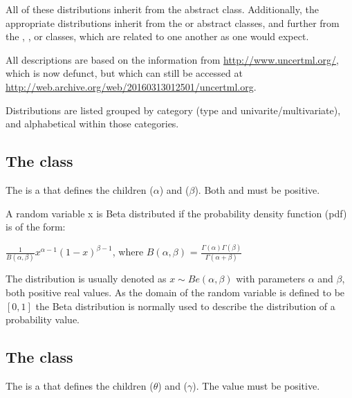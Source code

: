 All of these distributions inherit from the abstract \Distribution class.  Additionally, the appropriate distributions inherit from the \UnivariateDistribution or \MultivariateDistribution abstract classes, and further from the \ContinuousUnivariateDistribution, \DiscreteUnivariateDistribution, or \CategoricalUnivariateDistribution classes, which are related to one another as one would expect.

All descriptions are based on the information from \url{http://www.uncertml.org/}, which is now defunct, but which can still be accessed at \url{http://web.archive.org/web/20160313012501/uncertml.org}.

Distributions are listed grouped by category (type and univarite/multivariate), and alphabetical within those categories.


\subsection{The  class}
\label{BetaDistribution-class}
\label{betadistribution-class}

The \BetaDistribution is a \ContinuousUnivariateDistribution that defines the \UncertValue children  ($\alpha$) and  ($\beta$).  Both  and  must be positive.

A random variable x is Beta distributed if the probability density function (pdf) is of the form:

\begin{center}
$\frac{1}{B\left(\alpha,\beta\right)}x^{\alpha-1}\left(1-x\right)^{\beta-1}$, where $B\left(\alpha,\beta\right)$ = $\frac{\Gamma\left(\alpha\right)\Gamma\left(\beta\right)}{\Gamma\left(\alpha+\beta\right)}$
\end{center}

The distribution is usually denoted as $x\sim Be\left(\alpha,\beta\right)$ with parameters $\alpha$ and $\beta$, both positive real values. As the domain of the random variable is defined to be $[0,1]$ the Beta distribution is normally used to describe the distribution of a probability value.

\subsection{The  class}
\label{CauchyDistribution-class}
\label{cauchydistribution-class}

The \CauchyDistribution is a \ContinuousUnivariateDistribution that defines the \UncertValue children  ($\theta$) and  ($\gamma$).  The  value must be positive.

